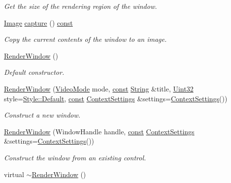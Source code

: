 \begin{DoxyCompactItemize}
\begin{DoxyCompactList}\small\item\em Get the size of the rendering region of the window. \end{DoxyCompactList}\item 
\hyperlink{classsf_1_1_image}{Image} \hyperlink{classsf_1_1_render_window_a9bd8655d0bac83145bfc329ea7a6d538}{capture} () \hyperlink{term__entry_8h_a57bd63ce7f9a353488880e3de6692d5a}{const} 
\begin{DoxyCompactList}\small\item\em Copy the current contents of the window to an image. \end{DoxyCompactList}\item 
\hyperlink{classsf_1_1_render_window_a839bbf336bdcafb084dafc3076fc9021}{Render\-Window} ()
\begin{DoxyCompactList}\small\item\em Default constructor. \end{DoxyCompactList}\item 
\hyperlink{classsf_1_1_render_window_aebef983e01f677bf5a66cefc4d547647}{Render\-Window} (\hyperlink{classsf_1_1_video_mode}{Video\-Mode} mode, \hyperlink{term__entry_8h_a57bd63ce7f9a353488880e3de6692d5a}{const} \hyperlink{classsf_1_1_string}{String} \&title, \hyperlink{namespacesf_aa746fb1ddef4410bddf198ebb27e727c}{Uint32} style=\hyperlink{group__window_gga363853f6419f9ca64dcd85eae2e5caa9aaf73ca9c9fa787f9da9c1d7527d42734}{Style\-::\-Default}, \hyperlink{term__entry_8h_a57bd63ce7f9a353488880e3de6692d5a}{const} \hyperlink{structsf_1_1_context_settings}{Context\-Settings} \&settings=\hyperlink{structsf_1_1_context_settings}{Context\-Settings}())
\begin{DoxyCompactList}\small\item\em Construct a new window. \end{DoxyCompactList}\item 
\hyperlink{classsf_1_1_render_window_a25c0af7d515e710b6eebc9c6be952aa5}{Render\-Window} (Window\-Handle handle, \hyperlink{term__entry_8h_a57bd63ce7f9a353488880e3de6692d5a}{const} \hyperlink{structsf_1_1_context_settings}{Context\-Settings} \&settings=\hyperlink{structsf_1_1_context_settings}{Context\-Settings}())
\begin{DoxyCompactList}\small\item\em Construct the window from an existing control. \end{DoxyCompactList}\item 
virtual \hyperlink{classsf_1_1_render_window_a3407e36bfc1752d723140438a825365c}{$\sim$\-Render\-Window} ()

\end{DoxyCompactItemize}
